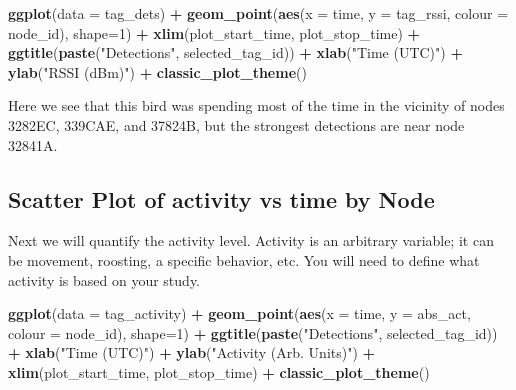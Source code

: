 \documentclass[
]{book}
\newenvironment{Shaded}{\begin{snugshade}}{\end{snugshade}}
\newcommand{\AttributeTok}[1]{\textcolor[rgb]{0.13,0.29,0.53}{#1}}
\newcommand{\DecValTok}[1]{\textcolor[rgb]{0.00,0.00,0.81}{#1}}
\newcommand{\FunctionTok}[1]{\textcolor[rgb]{0.13,0.29,0.53}{\textbf{#1}}}
\newcommand{\NormalTok}[1]{#1}
\newcommand{\SpecialCharTok}[1]{\textcolor[rgb]{0.81,0.36,0.00}{\textbf{#1}}}
\newcommand{\StringTok}[1]{\textcolor[rgb]{0.31,0.60,0.02}{#1}}
\begin{document}
\begin{Shaded}
\begin{Highlighting}[]
\FunctionTok{ggplot}\NormalTok{(}\AttributeTok{data =}\NormalTok{ tag\_dets) }\SpecialCharTok{+}
  \FunctionTok{geom\_point}\NormalTok{(}\FunctionTok{aes}\NormalTok{(}\AttributeTok{x =}\NormalTok{ time, }
                 \AttributeTok{y =}\NormalTok{ tag\_rssi, }
                 \AttributeTok{colour =}\NormalTok{ node\_id), }
             \AttributeTok{shape=}\DecValTok{1}\NormalTok{) }\SpecialCharTok{+}
  \FunctionTok{xlim}\NormalTok{(plot\_start\_time, plot\_stop\_time) }\SpecialCharTok{+}
  \FunctionTok{ggtitle}\NormalTok{(}\FunctionTok{paste}\NormalTok{(}\StringTok{"Detections"}\NormalTok{, selected\_tag\_id)) }\SpecialCharTok{+}
  \FunctionTok{xlab}\NormalTok{(}\StringTok{"Time (UTC)"}\NormalTok{) }\SpecialCharTok{+} 
  \FunctionTok{ylab}\NormalTok{(}\StringTok{"RSSI (dBm)"}\NormalTok{) }\SpecialCharTok{+}
  \FunctionTok{classic\_plot\_theme}\NormalTok{()}
\end{Highlighting}
\end{Shaded}

Here we see that this bird was spending most of the time in the vicinity of nodes 3282EC, 339CAE, and 37824B, but the strongest detections are near node 32841A.

\subsection{Scatter Plot of activity vs time by Node}\label{scatter-plot-of-activity-vs-time-by-node}

Next we will quantify the activity level. Activity is an arbitrary variable; it can be movement, roosting, a specific behavior, etc. You will need to define what activity is based on your study.

\begin{Shaded}
\begin{Highlighting}[]
\FunctionTok{ggplot}\NormalTok{(}\AttributeTok{data =}\NormalTok{ tag\_activity) }\SpecialCharTok{+}
  \FunctionTok{geom\_point}\NormalTok{(}\FunctionTok{aes}\NormalTok{(}\AttributeTok{x =}\NormalTok{ time, }
                 \AttributeTok{y =}\NormalTok{ abs\_act, }
                 \AttributeTok{colour =}\NormalTok{ node\_id), }
             \AttributeTok{shape=}\DecValTok{1}\NormalTok{) }\SpecialCharTok{+}
  \FunctionTok{ggtitle}\NormalTok{(}\FunctionTok{paste}\NormalTok{(}\StringTok{"Detections"}\NormalTok{, selected\_tag\_id)) }\SpecialCharTok{+}
  \FunctionTok{xlab}\NormalTok{(}\StringTok{"Time (UTC)"}\NormalTok{) }\SpecialCharTok{+}
  \FunctionTok{ylab}\NormalTok{(}\StringTok{"Activity (Arb. Units)"}\NormalTok{) }\SpecialCharTok{+}
  \FunctionTok{xlim}\NormalTok{(plot\_start\_time, plot\_stop\_time) }\SpecialCharTok{+}
  \FunctionTok{classic\_plot\_theme}\NormalTok{()}
\end{Highlighting}
\end{Shaded}
\end{document}
